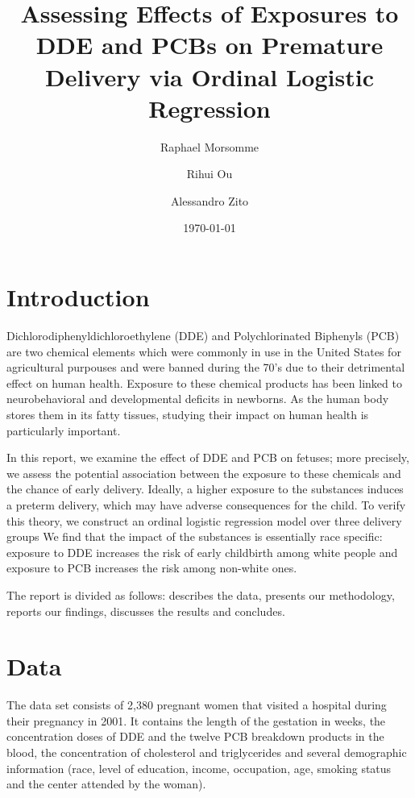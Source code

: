 \documentclass[wcp]{jmlr}%
\title[DDE and PCB effect on Premature delivery]{Assessing Effects of Exposures to DDE and PCBs on Premature Delivery via Ordinal Logistic Regression}	%
\author[Morsomme, Ou, Zito]{Raphael Morsomme \and Rihui Ou \and Alessandro Zito}
\date{\today} %
\begin{document}
\maketitle


\section{Introduction}
\label{sec:intro}

Dichlorodiphenyldichloroethylene (DDE) and Polychlorinated Biphenyls (PCB) are two chemical elements which were commonly in use in the United States for agricultural purpouses and were banned during the 70's due to their detrimental effect on human health. Exposure to these chemical products has been linked to neurobehavioral and developmental deficits in newborns. As the human body stores them in its fatty tissues, studying their impact on human health is particularly important.

In this report, we examine the effect of DDE and PCB on fetuses; more precisely, we assess the potential association between the exposure to these chemicals and the chance of early delivery. Ideally, a higher exposure to the substances induces a preterm delivery, which may have adverse consequences for the child. To verify this theory, we construct an ordinal logistic regression model over three delivery groups  We find that the impact of the substances is essentially race specific: exposure to DDE increases the risk of early childbirth among white people and exposure to PCB increases the risk among non-white ones. 

The report is divided as follows:  describes the data,  presents our methodology,   reports our findings,  discusses the results and concludes.

\section{Data}
\label{sec:data}
The data set consists of 2,380 pregnant women that visited a hospital during their pregnancy in 2001. It contains the length of the gestation in weeks, the concentration doses of DDE and the twelve PCB breakdown products in the blood, the concentration of cholesterol and triglycerides and several demographic information (race, level of education, income, occupation, age, smoking status and the center attended by the woman).
\end{document}
